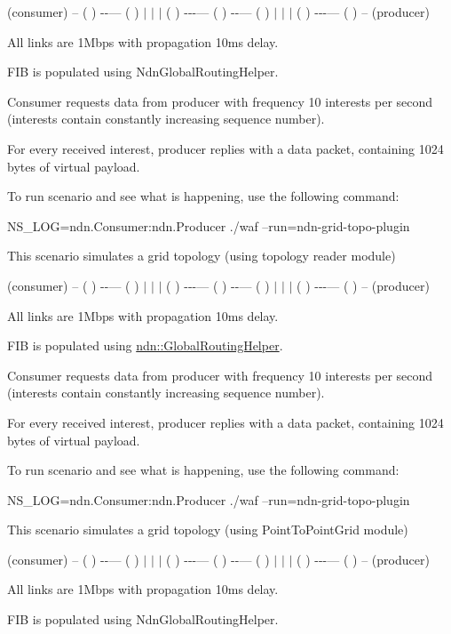 (consumer) -- ( ) -\/-\/--- ( ) $\vert$ $\vert$ $\vert$ ( ) -\/-\/-\/--- ( ) -\/-\/--- ( ) $\vert$ $\vert$ $\vert$ ( ) -\/-\/-\/--- ( ) -- (producer)

All links are 1\+Mbps with propagation 10ms delay.

F\+IB is populated using Ndn\+Global\+Routing\+Helper.

Consumer requests data from producer with frequency 10 interests per second (interests contain constantly increasing sequence number).

For every received interest, producer replies with a data packet, containing 1024 bytes of virtual payload.

To run scenario and see what is happening, use the following command\+: \begin{DoxyVerb}NS_LOG=ndn.Consumer:ndn.Producer ./waf --run=ndn-grid-topo-plugin\end{DoxyVerb}


This scenario simulates a grid topology (using topology reader module)

(consumer) -- ( ) -\/-\/--- ( ) $\vert$ $\vert$ $\vert$ ( ) -\/-\/-\/--- ( ) -\/-\/--- ( ) $\vert$ $\vert$ $\vert$ ( ) -\/-\/-\/--- ( ) -- (producer)

All links are 1\+Mbps with propagation 10ms delay.

F\+IB is populated using \hyperlink{classns3_1_1ndn_1_1GlobalRoutingHelper}{ndn\+::\+Global\+Routing\+Helper}.

Consumer requests data from producer with frequency 10 interests per second (interests contain constantly increasing sequence number).

For every received interest, producer replies with a data packet, containing 1024 bytes of virtual payload.

To run scenario and see what is happening, use the following command\+: \begin{DoxyVerb}NS_LOG=ndn.Consumer:ndn.Producer ./waf --run=ndn-grid-topo-plugin\end{DoxyVerb}


This scenario simulates a grid topology (using Point\+To\+Point\+Grid module)

(consumer) -- ( ) -\/-\/--- ( ) $\vert$ $\vert$ $\vert$ ( ) -\/-\/-\/--- ( ) -\/-\/--- ( ) $\vert$ $\vert$ $\vert$ ( ) -\/-\/-\/--- ( ) -- (producer)

All links are 1\+Mbps with propagation 10ms delay.

F\+IB is populated using Ndn\+Global\+Routing\+Helper.

